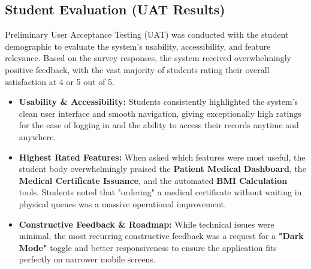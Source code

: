 \subsection{Student Evaluation (UAT Results)}
Preliminary User Acceptance Testing (UAT) was conducted with the student demographic to evaluate the system's usability, accessibility, and feature relevance. Based on the survey responses, the system received overwhelmingly positive feedback, with the vast majority of students rating their overall satisfaction at 4 or 5 out of 5.

\begin{itemize}
    \item \textbf{Usability \& Accessibility:} Students consistently highlighted the system's clean user interface and smooth navigation, giving exceptionally high ratings for the ease of logging in and the ability to access their records anytime and anywhere.
    \item \textbf{Highest Rated Features:} When asked which features were most useful, the student body overwhelmingly praised the \textbf{Patient Medical Dashboard}, the \textbf{Medical Certificate Issuance}, and the automated \textbf{BMI Calculation} tools. Students noted that "ordering" a medical certificate without waiting in physical queues was a massive operational improvement.
    \item \textbf{Constructive Feedback \& Roadmap:} While technical issues were minimal, the most recurring constructive feedback was a request for a \textbf{"Dark Mode"} toggle and better responsiveness to ensure the application fits perfectly on narrower mobile screens.
\end{itemize}
